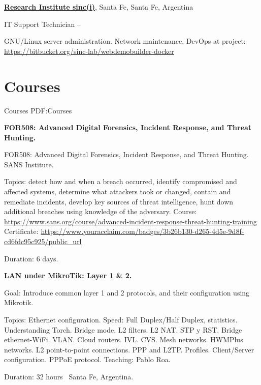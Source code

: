 \documentclass[letterpaper,MMMyyyy,nonstop]{simpleresumecv}
\begin{document}
\begin{body}
\href{http://www.sinc.unl.edu.ar}
{\textbf{Research Institute sinc(i)}},
Santa Fe, Santa Fe, Argentina

\GapNoBreak
\BulletItem
IT Support Technician
\hfill
{} --
\begin{detail}
\SubBulletItem
GNU/Linux server administration.
\SubBulletItem
Network maintenance.
\SubBulletItem
DevOps at project: \href{https://bitbucket.org/sinc-lab/webdemobuilder-docker}{https://bitbucket.org/sinc-lab/webdemobuilder-docker}
\end{detail}


\section
{Courses}
{Courses}
{PDF:Courses}


\textbf{FOR508: Advanced Digital Forensics, Incident Response, and Threat Hunting.}
\hfill
{}

\BulletItem FOR508: Advanced Digital Forensics, Incident Response, and Threat Hunting. SANS Institute.
\begin{detail}
	\SubBulletItem 
	Topics: detect how and when a breach occurred, identify compromised and affected systems, determine what attackers took or changed, contain and remediate incidents, develop key sources of threat intelligence, hunt down additional breaches using knowledge of the adversary.	
	\SubBulletItem
	Course: \href{https://www.sans.org/course/advanced-incident-response-threat-hunting-training}{https://www.sans.org/course/advanced-incident-response-threat-hunting-training}
	\SubBulletItem
	Certificate: \href{https://www.youracclaim.com/badges/3b26b130-d265-4d5e-9d8f-cd6fdc95c925/public\_url}{https://www.youracclaim.com/badges/3b26b130-d265-4d5e-9d8f-cd6fdc95c925/public\_url}
\end{detail}
Duration: 6 days.

\BigGap
\textbf{LAN under MikroTik: Layer 1 \& 2.}
\hfill
{}

\BulletItem Goal: Introduce common layer 1 and 2 protocols, and their configuration using Mikrotik.

\begin{detail}
	\SubBulletItem 
	Topics: Ethernet configuration. Speed: Full Duplex/Half Duplex, statistics. Understanding Torch. Bridge mode.  L2 filters. L2 NAT. STP y RST. Bridge ethernet-WiFi. VLAN. Cloud routers. IVL. CVS. Mesh networks. HWMPlus networks. L2 point-to-point connections. PPP and L2TP. Profiles. Client/Server configuration. PPPoE protocol.
	\SubBulletItem Teaching: Pablo Roa.
\end{detail}
Duration: 32 hours \SubBulletSymbol\, Santa Fe, Argentina.


\end{body}
\end{document}
